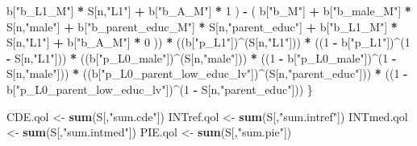 \documentclass[
]{book}
\newenvironment{Shaded}{\begin{snugshade}}{\end{snugshade}}
\newcommand{\DecValTok}[1]{\textcolor[rgb]{0.00,0.00,0.81}{#1}}
\newcommand{\FunctionTok}[1]{\textcolor[rgb]{0.13,0.29,0.53}{\textbf{#1}}}
\newcommand{\NormalTok}[1]{#1}
\newcommand{\OtherTok}[1]{\textcolor[rgb]{0.56,0.35,0.01}{#1}}
\newcommand{\SpecialCharTok}[1]{\textcolor[rgb]{0.81,0.36,0.00}{\textbf{#1}}}
\newcommand{\StringTok}[1]{\textcolor[rgb]{0.31,0.60,0.02}{#1}}
\begin{document}
\begin{Shaded}
\begin{Highlighting}[]
\NormalTok{            b[}\StringTok{"b\_L1\_M"}\NormalTok{] }\SpecialCharTok{*}\NormalTok{ S[n,}\StringTok{"L1"}\NormalTok{] }\SpecialCharTok{+}
\NormalTok{            b[}\StringTok{"b\_A\_M"}\NormalTok{] }\SpecialCharTok{*} \DecValTok{1}\NormalTok{ ) }\SpecialCharTok{{-}} 
\NormalTok{          ( b[}\StringTok{"b\_M"}\NormalTok{] }\SpecialCharTok{+} 
\NormalTok{              b[}\StringTok{"b\_male\_M"}\NormalTok{] }\SpecialCharTok{*}\NormalTok{ S[n,}\StringTok{"male"}\NormalTok{] }\SpecialCharTok{+} 
\NormalTok{              b[}\StringTok{"b\_parent\_educ\_M"}\NormalTok{] }\SpecialCharTok{*}\NormalTok{ S[n,}\StringTok{"parent\_educ"}\NormalTok{] }\SpecialCharTok{+} 
\NormalTok{              b[}\StringTok{"b\_L1\_M"}\NormalTok{] }\SpecialCharTok{*}\NormalTok{ S[n,}\StringTok{"L1"}\NormalTok{] }\SpecialCharTok{+}
\NormalTok{              b[}\StringTok{"b\_A\_M"}\NormalTok{] }\SpecialCharTok{*} \DecValTok{0}\NormalTok{ )) }\SpecialCharTok{*} 
\NormalTok{      ((b[}\StringTok{"p\_L1"}\NormalTok{])}\SpecialCharTok{\^{}}\NormalTok{(S[n,}\StringTok{"L1"}\NormalTok{])) }\SpecialCharTok{*}
\NormalTok{      ((}\DecValTok{1} \SpecialCharTok{{-}}\NormalTok{ b[}\StringTok{"p\_L1"}\NormalTok{])}\SpecialCharTok{\^{}}\NormalTok{(}\DecValTok{1} \SpecialCharTok{{-}}\NormalTok{ S[n,}\StringTok{"L1"}\NormalTok{])) }\SpecialCharTok{*}
\NormalTok{      ((b[}\StringTok{"p\_L0\_male"}\NormalTok{])}\SpecialCharTok{\^{}}\NormalTok{(S[n,}\StringTok{"male"}\NormalTok{])) }\SpecialCharTok{*} 
\NormalTok{      ((}\DecValTok{1} \SpecialCharTok{{-}}\NormalTok{ b[}\StringTok{"p\_L0\_male"}\NormalTok{])}\SpecialCharTok{\^{}}\NormalTok{(}\DecValTok{1} \SpecialCharTok{{-}}\NormalTok{ S[n,}\StringTok{"male"}\NormalTok{])) }\SpecialCharTok{*} 
\NormalTok{      ((b[}\StringTok{"p\_L0\_parent\_low\_educ\_lv"}\NormalTok{])}\SpecialCharTok{\^{}}\NormalTok{(S[n,}\StringTok{"parent\_educ"}\NormalTok{])) }\SpecialCharTok{*}
\NormalTok{      ((}\DecValTok{1} \SpecialCharTok{{-}}\NormalTok{ b[}\StringTok{"p\_L0\_parent\_low\_educ\_lv"}\NormalTok{])}\SpecialCharTok{\^{}}\NormalTok{(}\DecValTok{1} \SpecialCharTok{{-}}\NormalTok{ S[n,}\StringTok{"parent\_educ"}\NormalTok{])) }
\NormalTok{    \}}
  
\NormalTok{  CDE.qol }\OtherTok{\textless{}{-}} \FunctionTok{sum}\NormalTok{(S[,}\StringTok{"sum.cde"}\NormalTok{])}
\NormalTok{  INTref.qol }\OtherTok{\textless{}{-}} \FunctionTok{sum}\NormalTok{(S[,}\StringTok{"sum.intref"}\NormalTok{])}
\NormalTok{  INTmed.qol }\OtherTok{\textless{}{-}} \FunctionTok{sum}\NormalTok{(S[,}\StringTok{"sum.intmed"}\NormalTok{])}
\NormalTok{  PIE.qol }\OtherTok{\textless{}{-}} \FunctionTok{sum}\NormalTok{(S[,}\StringTok{"sum.pie"}\NormalTok{])}
  

\end{Highlighting}
\end{Shaded}
\end{document}
